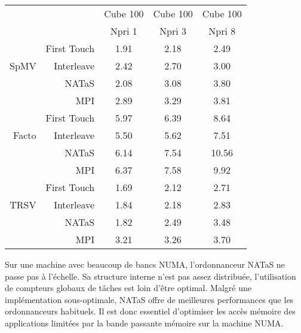 \begin{center}
  \begin{tabular}{|r|r|c|c|c|}
    \hline
       & & Cube 100 & Cube 100 & Cube 100 \\
       & & Npri 1   & Npri 3   & Npri 8 \\
    \hline
&        First Touch & 1.91 & 2.18 & 2.49 \\
SpMV &   Interleave  & 2.42 & 2.70 & 3.00 \\
&        NATaS       & 2.08 & 3.08 & 3.80 \\
&        MPI         & 2.89 & 3.29 & 3.81 \\
    \hline
&        First Touch & 5.97 & 6.39 & 8.64 \\
Facto &  Interleave  & 5.50 & 5.62 & 7.51 \\
&        NATaS       & 6.14 & 7.54 & 10.56 \\
&        MPI         & 6.37 & 7.58 & 9.92 \\
    \hline
&        First Touch & 1.69 & 2.12 & 2.71 \\
TRSV &   Interleave  & 1.84 & 2.18 & 2.83 \\
&        NATaS       & 1.82 & 2.49 & 3.48 \\
&        MPI         & 3.21 & 3.26 & 3.70 \\
    \hline
  \end{tabular}
  \label{tab:rostand_sum}
\end{center}

Sur une machine avec beaucoup de bancs NUMA, l'ordonnanceur NATaS ne passe pas à l'échelle.
%
Sa structure interne n'est pas assez distribuée, l'utilisation de compteurs globaux de tâches est loin d'être optimal.
%
Malgré une implémentation sous-optimale, NATaS offre de meilleures performances que les ordonnanceurs habituels.
%
Il est donc essentiel d'optimiser les accès mémoire des applications limitées par la bande passante mémoire sur la machine NUMA.
